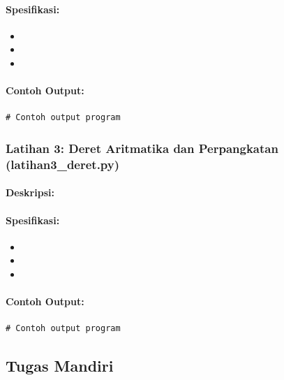 \documentclass[12pt,a4paper]{article}
\begin{document}
\paragraph{Spesifikasi:}
\begin{itemize}
    \item 
    \item 
    \item 
\end{itemize}

\paragraph{Contoh Output:}

\begin{lstlisting}
# Contoh output program
\end{lstlisting}

\subsubsection{Latihan 3: Deret Aritmatika dan Perpangkatan (latihan3\_deret.py)}

\paragraph{Deskripsi:}

\paragraph{Spesifikasi:}
\begin{itemize}
    \item 
    \item 
    \item 
\end{itemize}

\paragraph{Contoh Output:}

\begin{lstlisting}
# Contoh output program
\end{lstlisting}

\subsection{Tugas Mandiri}
\end{document}
